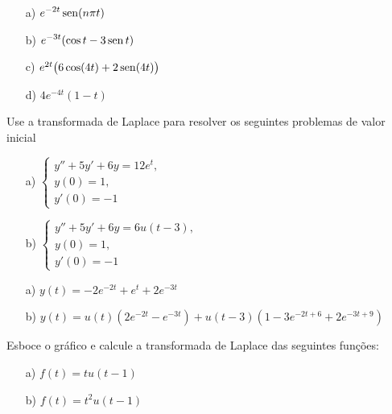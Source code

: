 \begin{Answer}
\begin{itemize}
\item[a)] $\displaystyle e^{-2t} \operatorname{sen} (n\pi t)$
  \item[b)] $\displaystyle e^{-3t} (\cos t - 3\operatorname{sen}  t)$
  \item[c)] $e^{2t} \big(6\cos (4t) + 2 \operatorname{sen} (4t)\big)$
  \item[d)] $\displaystyle 4e^{-4t} (1-t)$
\end{itemize}
  \end{Answer}

\begin{Exercise}Use a transformada de Laplace para resolver os seguintes problemas de valor inicial
\begin{itemize}
 \item[a)] $\displaystyle\left\{ \begin{array}{l}y''+5y'+6y=12e^t,\\ y(0)=1,\\y'(0)=-1 \end{array}\right.$
 \item[b)] $\displaystyle\left\{ \begin{array}{l}y''+5y'+6y=6u(t-3),\\ y(0)=1,\\y'(0)=-1 \end{array}\right.$
\end{itemize}

 
\end{Exercise}
\begin{Answer}
\begin{itemize}
 \item[a)] $y(t)=-2e^{-2t}+e^{t}+2e^{-3t}$
 \item[b)] $y(t)=u(t)\left(2e^{-2t}-e^{-3t}\right)+u(t-3)\left(1-3e^{-2t+6}+2e^{-3t+9}\right)$
\end{itemize}
 
\end{Answer}

\begin{Exercise}Esboce o gráfico e calcule a transformada de Laplace das seguintes funções:
 \begin{itemize}
  \item[a)] $f(t)=tu(t-1)$
  \item[b)] $f(t)=t^2u(t-1)$
 \end{itemize}

\end{Exercise}

